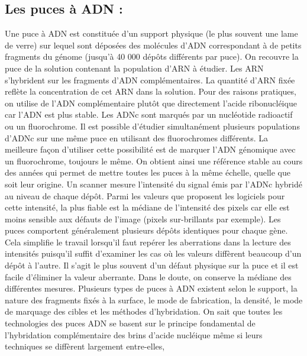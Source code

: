 \documentclass[a4paper,10pt]{article}
\begin{document}
\subsection{Les puces à ADN :}
  Une puce à ADN est constituée d'un support physique (le plus
  souvent une lame de verre) sur lequel sont déposées des molécules
  d'ADN correspondant à de petits fragments du génome (jusqu'à 40 000
  dépôts différents par puce). On recouvre la puce
  de la solution contenant la population d'ARN à étudier. Les ARN
  s'hybrident sur les fragments d'ADN complémentaires. La quantité d'ARN
  fixée reflète la concentration de cet ARN dans la solution.
  \newline
 Pour des raisons pratiques, on utilise de l’ADN complémentaire plutôt que directement
  l'acide ribonucléique car l’ADN est plus stable. Les ADNc sont marqués par un nucléotide radioactif ou
  un fluorochrome. Il est possible d'étudier simultanément plusieurs
  populations d'ADNc sur une même puce en utilisant des fluorochromes différents.
  La meilleure façon d'utiliser cette possibilité est de marquer
  l'ADN génomique avec un fluorochrome, toujours le même. On
  obtient ainsi une référence stable au cours des années
  qui permet de mettre toutes les puces à la même échelle,
  quelle que soit leur origine. 
  \newline
  Un scanner mesure l'intensité du signal émis par l'ADNc hybridé au niveau de chaque dépôt. Parmi les valeurs que proposent les
  logiciels pour cette intensité, la plus fiable est la médiane de l'intensité des pixels car elle est moins sensible aux défauts de
  l'image (pixels sur-brillants par exemple). 
  \newline
  Les puces comportent généralement plusieurs dépôts identiques pour chaque gène. Cela simplifie le travail lorsqu'il faut
  repérer les aberrations dans la lecture des intensités puisqu'il suffit d'examiner les cas où les valeurs diffèrent beaucoup d'un
  dépôt à l'autre. Il s'agit le plus souvent d'un défaut physique sur la puce et il est facile d'éliminer la valeur aberrante.
  Dans le doute, on conserve la médiane des différentes mesures. 
  \newline
  Plusieurs  types  de  puces  à  ADN  
existent selon le support, la nature des fragments fixés à la surface, le mode de fabrication, la 
densité, le mode de marquage des cibles et les méthodes d’hybridation.
On sait que toutes les technologies des puces ADN se basent sur le principe fondamental de l’hybridation complémentaire des brins d’acide nucléique même si leurs techniques se diffèrent largement entre-elles, 
\end{document}
